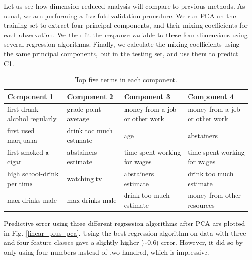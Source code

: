 Let us see how dimension-reduced analysis will compare to previous methods. As usual, we are performing a five-fold validation procedure. We run PCA on the training set to extract four principal components, and their mixing coefficients for each observation. We then fit the response variable to these four dimensions using several regression algorithms. Finally, we calculate the mixing coefficients using the same principal components, but in the testing set, and use them to predict C1. 


\begin{table}[ht]
\begin{tabular}{l l l l}
\hline \hline
Component 1 & Component 2 &Component 3&Component 4\\ \hline 
first drank alcohol regularly &		grade point average		&money from a job or other work&money from a job or other work\\
first used marijuana  &		drink too much estimate	&age					&	abstainers\\
first smoked a cigar&		abstainers estimate		&time spent working for wages	&time spent working for wages\\
high school-drink per time&watching tv			&abstainers estimate		&drink too much estimate\\
max drinks male&		max drinks male		&drink too much estimate		&money from other resources\\
\hline
\end{tabular}
\caption{Top five terms in each component.}
\label{components}
\end{table}

Predictive error using three different regression algorithms after PCA are plotted in Fig. \ref{linear_plus_pca}. Using the best regression algorithm on data with three and four feature classes gave a slightly higher (\textasciitilde 0.6) error. However, it did so by only using four numbers instead of two hundred, which is impressive.

